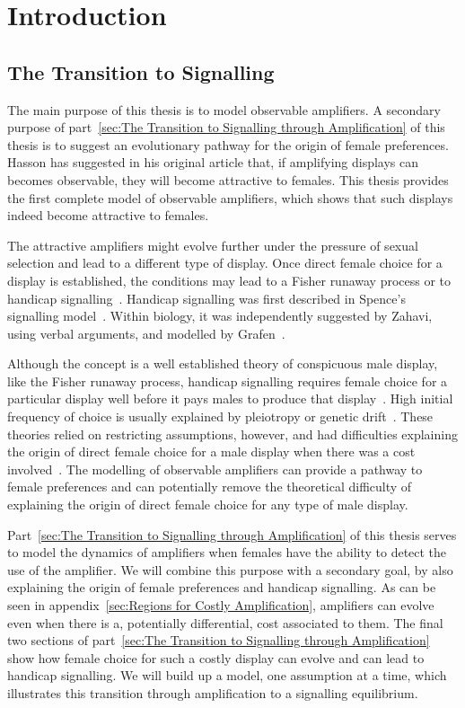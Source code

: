\documentclass[a4paper,12pt]{article}
\numberwithin{equation}{section}
\begin{document}
\newpage\clearpage

\section{Introduction}
\label{sec:Part2/Introduction}
\subsection{The Transition to Signalling}
\label{sec:The Transition to Signalling}

The main purpose of this thesis is to model observable amplifiers. A secondary purpose of part~\ref{sec:The Transition to Signalling through Amplification} of this thesis is to suggest an evolutionary pathway for the origin of female preferences. Hasson has suggested in his original article that, if amplifying displays can becomes observable, they will become attractive to females. This thesis provides the first complete model of observable amplifiers, which shows that such displays indeed become attractive to females.

The attractive amplifiers might evolve further under the pressure of sexual selection and lead to a different type of display. Once direct female choice for a display is established, the conditions may lead to a Fisher runaway process or to handicap signalling~\cite{Hasson1990}. Handicap signalling was first described in Spence's signalling model~\cite{Spence1973}. Within biology, it was independently suggested by Zahavi, using verbal arguments, and modelled by Grafen~\cite{Zahavi1975, Zahavi1977, Grafen1990, Grafen1990a}.

Although the concept is a well established theory of conspicuous male display, like the Fisher runaway process, handicap signalling requires female choice for a particular display well before it pays males to produce that display~\cite{Kirkpatrick1982}. High initial frequency of choice is usually explained by pleiotropy or genetic drift~\cite{Kirkpatrick1982, Heisler1984}. These theories relied on restricting assumptions, however, and had difficulties explaining the origin of direct female choice for a male display when there was a cost involved~\cite{Pomiankowski1987}. The modelling of observable amplifiers can provide a pathway to female preferences and can potentially remove the theoretical difficulty of explaining the origin of direct female choice for any type of male display.

Part~\ref{sec:The Transition to Signalling through Amplification} of this thesis serves to model the dynamics of amplifiers when females have the ability to detect the use of the amplifier. We will combine this purpose with a secondary goal, by also explaining the origin of female preferences and handicap signalling. As can be seen in appendix~\ref{sec:Regions for Costly Amplification}, amplifiers can evolve even when there is a, potentially differential, cost associated to them. The final two sections of part~\ref{sec:The Transition to Signalling through Amplification} show how female choice for such a costly display can evolve and can lead to handicap signalling. We will build up a model, one assumption at a time, which illustrates this transition through amplification to a signalling equilibrium.
\end{document}

